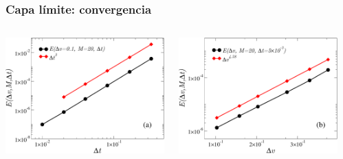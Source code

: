 
\begin{frame}
\frametitle{Capa límite: convergencia}

\begin{columns}
\begin{column}{0.33\textwidth}
  \includegraphics[width=1.1\textwidth]{figuras/errdt.pdf}
\end{column}
\begin{column}{0.33\textwidth}
  \includegraphics[width=1.1\textwidth]{figuras/errdx.pdf}
\end{column}
\begin{column}{0.33\textwidth}

\end{column}
\end{columns}
\end{frame}
